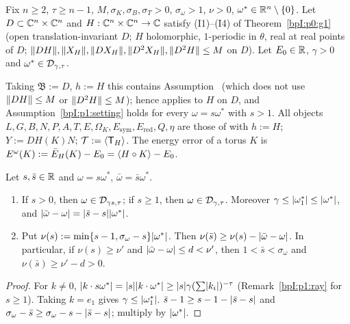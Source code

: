 \begin{assumption}\label{bpI:p2:standing}
Fix $n\ge2$, $\tau\ge n-1$, $M,\sigma_K,\sigma_B,\sigma_T>0$, $\sigma_\omega>1$, $\nu>0$, $\omega^*\in\mathbb{R}^n\setminus\{0\}$.
Let $D\subset\mathbb{C}^n\times\mathbb{C}^n$ and $H:\mathbb{C}^n\times\mathbb{C}^n\to\mathbb{C}$ satisfy (I1)--(I4) of Theorem~\ref{bpI:p0:g1}
(open translation-invariant $D$; $H$ holomorphic, $1$-periodic in $\theta$, real at real points of $D$;
$\lVert DH\rVert,\lVert X_H\rVert,\lVert DX_H\rVert,\lVert D^2X_H\rVert,\lVert D^2H\rVert\le M$ on $D$). Let $E_0\in\mathbb{R}$, $\gamma>0$ and
$\omega^*\in\mathcal{D}_{\gamma,\tau}$.
\end{assumption}

Taking $\mathfrak B:=D$, $h:=H$ this contains Assumption~ (which does not use $\lVert DH\rVert\le M$ or
$\lVert D^2H\rVert\le M$); hence  applies to $H$ on $D$, and Assumption~\ref{bpI:p1:setting} holds for every
$\omega=s\omega^*$ with $s>1$. All objects $L,G,B,N,P,A,T,E,\Omega_K,E_{\mathrm{sym}},E_{\mathrm{red}},Q,\eta$ are those of
 with $h:=H$; $Y:=DH(K)N$; $\mathcal T:=\langle \mathsf T_H\rangle$.
The energy error of a torus $K$ is $E^\omega(K):=\bar E_H(K)-E_0=\langle H\circ K\rangle-E_0$.

\begin{lemma}\label{bpI:p2:ray}
Let $s,\bar s\in\mathbb{R}$ and $\omega=s\omega^*$, $\bar\omega=\bar s\omega^*$.
\begin{enumerate}[label=(\alph*)]
\item If $s>0$, then $\omega\in\mathcal{D}_{\gamma s,\tau}$; if $s\ge1$, then $\omega\in\mathcal{D}_{\gamma,\tau}$. Moreover $\gamma\le\lvert \omega^*_1\rvert\le\lvert \omega^*\rvert$, and
  $\lvert \bar\omega-\omega\rvert=\lvert \bar s-s\rvert\lvert \omega^*\rvert$.
\item Put $\nu(s):=\min\{s-1,\sigma_\omega-s\}\lvert \omega^*\rvert$. Then $\nu(\bar s)\ge\nu(s)-\lvert \bar\omega-\omega\rvert$. In particular, if $\nu(s)\ge\nu'$ and
  $\lvert \bar\omega-\omega\rvert\le d<\nu'$, then $1<\bar s<\sigma_\omega$ and $\nu(\bar s)\ge\nu'-d>0$.
\end{enumerate}
\end{lemma}
\begin{proof}
\label{stepI:p2:ray-dio}
For $k\ne0$, $\lvert k\cdot s\omega^*\rvert=\lvert s\rvert\lvert k\cdot\omega^*\rvert\ge\lvert s\rvert\gamma(\sum\lvert k_i\rvert)^{-\tau}$ (Remark~\ref{bpI:p1:ray} for $s\ge1$). Taking $k=e_1$ gives $\gamma\le\lvert \omega^*_1\rvert$.
\label{stepI:p2:ray-margin}
$\bar s-1\ge s-1-\lvert \bar s-s\rvert$ and $\sigma_\omega-\bar s\ge\sigma_\omega-s-\lvert \bar s-s\rvert$; multiply by $\lvert \omega^*\rvert$.
\end{proof}

